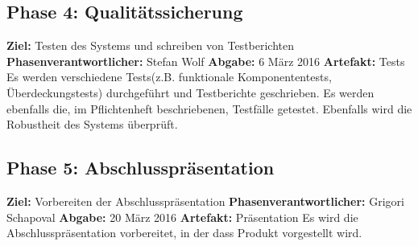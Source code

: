 \subsection{Phase 4: Qualitätssicherung}
\textbf{Ziel:} Testen des Systems und schreiben von Testberichten \newline
\textbf{Phasenverantwortlicher:} Stefan Wolf  \newline
\textbf{Abgabe:} 6 März 2016 \newline
\textbf{Artefakt:} Tests \newline
Es werden verschiedene Tests(z.B. funktionale Komponententests, Überdeckungstests) durchgeführt und Testberichte geschrieben. Es werden ebenfalls die, im Pflichtenheft beschriebenen, Testfälle getestet. Ebenfalls wird die Robustheit des Systems überprüft.

\subsection{Phase 5: Abschlusspräsentation}
\textbf{Ziel:} Vorbereiten der Abschlusspräsentation \newline
\textbf{Phasenverantwortlicher:} Grigori Schapoval  \newline
\textbf{Abgabe:} 20 März 2016 \newline
\textbf{Artefakt:} Präsentation \newline
Es wird die Abschlusspräsentation vorbereitet, in der dass Produkt vorgestellt wird.
